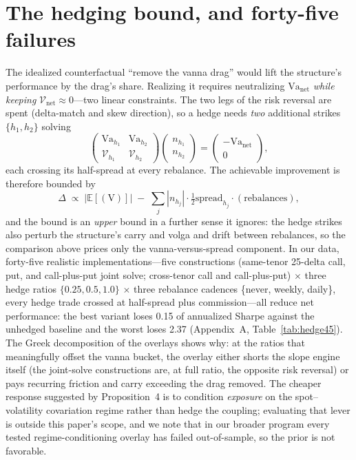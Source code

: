 \documentclass[11pt]{article}
\newcommand{\Va}{\mathrm{Va}}
\begin{document}
\section{The hedging bound, and forty-five failures}\label{sec:hedge}
The idealized counterfactual ``remove the vanna drag'' would lift the structure's performance
by the drag's share. Realizing it requires neutralizing $\Va_{\mathrm{net}}$ \emph{while
keeping} $\mathcal V_{\mathrm{net}} \approx 0$---two linear constraints. The two legs of the
risk reversal are spent (delta-match and skew direction), so a hedge needs \emph{two}
additional strikes $\{h_1, h_2\}$ solving
\[ \begin{pmatrix} \Va_{h_1} & \Va_{h_2} \\ \mathcal V_{h_1} & \mathcal V_{h_2} \end{pmatrix}
   \begin{pmatrix} n_{h_1} \\ n_{h_2} \end{pmatrix} =
   \begin{pmatrix} -\Va_{\mathrm{net}} \\ 0 \end{pmatrix}, \]
each crossing its half-spread at every rebalance. The achievable improvement is therefore
bounded by
\[ \Delta \;\propto\; \big|\mathbb E[(\mathrm V)]\big| \;-\;
   \textstyle\sum_j |n_{h_j}| \cdot \tfrac12 \mathrm{spread}_{h_j} \cdot (\text{rebalances}), \]
and the bound is an \emph{upper} bound in a further sense it ignores: the hedge strikes also
perturb the structure's carry and volga and drift between rebalances, so the comparison above
prices only the vanna-versus-spread component. In our data, forty-five realistic
implementations---five constructions (same-tenor 25-delta call, put, and call-plus-put joint
solve; cross-tenor call and call-plus-put) $\times$ three hedge ratios
$\{0.25, 0.5, 1.0\}$ $\times$ three rebalance cadences \{never, weekly, daily\}, every hedge
trade crossed at half-spread plus commission---all reduce net performance: the best variant
loses 0.15 of annualized Sharpe against the unhedged baseline and the worst loses 2.37
(Appendix~A, Table~\ref{tab:hedge45}). The Greek decomposition of the overlays shows why: at
the ratios that meaningfully offset the vanna bucket, the overlay either shorts the slope
engine itself (the joint-solve constructions are, at full ratio, the opposite risk reversal)
or pays recurring friction and carry exceeding the drag removed. The cheaper
response suggested by Proposition~4 is to condition \emph{exposure} on the spot--volatility
covariation regime rather than hedge the coupling; evaluating that lever is outside this
paper's scope, and we note that in our broader program every tested regime-conditioning
overlay has failed out-of-sample, so the prior is not favorable.
\end{document}
